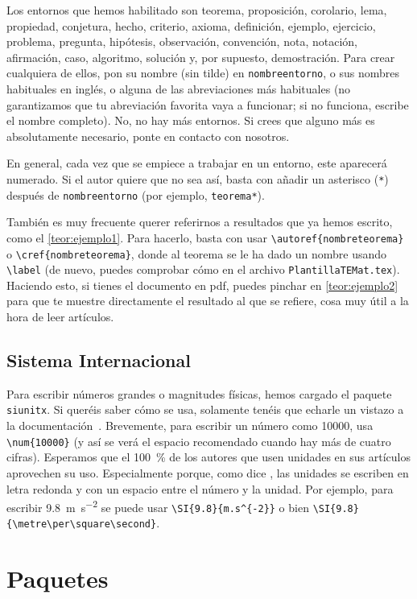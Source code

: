 \documentclass{TEMat-article}
\begin{document}
Los entornos que hemos habilitado son teorema, proposición, corolario, lema, propiedad, conjetura, hecho, criterio, axioma, definición, ejemplo, ejercicio, problema, pregunta, hipótesis, observación, convención, nota, notación, afirmación, caso, algoritmo, solución y, por supuesto, demostración.
Para crear cualquiera de ellos, pon su nombre (sin tilde) en \verb+nombreentorno+, o sus nombres habituales en inglés, o alguna de las abreviaciones más habituales (no garantizamos que tu abreviación favorita vaya a funcionar; si no funciona, escribe el nombre completo).
No, no hay más entornos.
Si crees que alguno más es absolutamente necesario, ponte en contacto con nosotros.

En general, cada vez que se empiece a trabajar en un entorno, este aparecerá numerado.
Si el autor quiere que no sea así, basta con añadir un asterisco (\verb+*+) después de \verb+nombreentorno+ (por ejemplo, \verb+teorema*+).

También es muy frecuente querer referirnos a resultados que ya hemos escrito, como el \autoref{teor:ejemplo1}. Para hacerlo, basta con usar \verb+\autoref{nombreteorema}+ o \verb+\cref{nombreteorema}+, donde al teorema se le ha dado un nombre usando \verb+\label+ (de nuevo, puedes comprobar cómo en el archivo \verb+PlantillaTEMat.tex+).
Haciendo esto, si tienes el documento en pdf, puedes pinchar en \autoref{teor:ejemplo2} para que te muestre directamente el resultado al que se refiere, cosa muy útil a la hora de leer artículos.

\subsection{Sistema Internacional}

Para escribir números grandes o magnitudes físicas, hemos cargado el paquete \verb+siunitx+.
Si queréis saber cómo se usa, solamente tenéis que echarle un vistazo a la documentación~\cite{siunitx}.
Brevemente, para escribir un número como \num{10000}, usa \verb+\num{10000}+ (y así se verá el espacio recomendado cuando hay más de cuatro cifras).
Esperamos que el \SI{100}{\percent} de los autores que usen unidades en sus artículos aprovechen su uso.
Especialmente porque, como dice \citet{bezosOM}, las unidades se escriben en letra redonda y con un espacio entre el número y la unidad.
Por ejemplo, para escribir \SI{9.8}{m.s^{-2}} se puede usar \verb+\SI{9.8}{m.s^{-2}}+ o bien \verb+\SI{9.8}{\metre\per\square\second}+.

\section{Paquetes}
\end{document}
